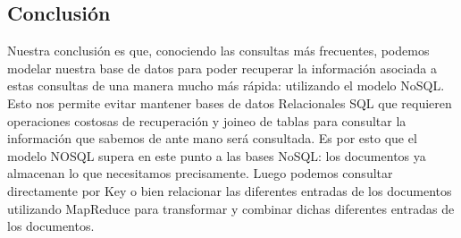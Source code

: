 \documentclass[10pt,a4paper]{article}
\begin{document}
\subsection{Conclusión}
Nuestra conclusión es que, conociendo las consultas más frecuentes, podemos modelar nuestra base de datos para poder recuperar la información asociada a estas consultas de una manera mucho más rápida: utilizando el modelo NoSQL. Esto nos permite evitar mantener bases de datos Relacionales SQL que requieren operaciones costosas de recuperación y joineo de tablas para consultar la información que sabemos de ante mano será consultada. Es por esto que el modelo NOSQL supera en este punto a las bases NoSQL: los documentos ya almacenan lo que necesitamos precisamente. Luego podemos consultar directamente por Key o bien relacionar las diferentes entradas de los documentos utilizando MapReduce para transformar y combinar dichas diferentes entradas de los documentos.
\end{document}
